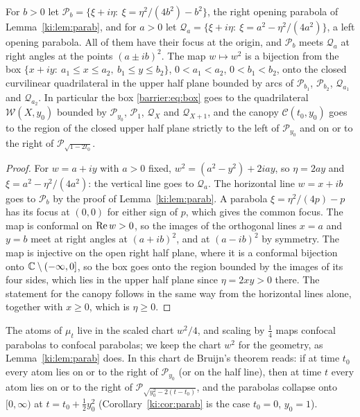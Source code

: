 \begin{lemma}\label{barrier:lem:quad}
For $b>0$ let $\mathcal P_b=\{\xi+i\eta:\ \xi=\eta^2/(4b^2)-b^2\}$, the right opening parabola of Lemma~\ref{ki:lem:parab}, and for $a>0$ let $\mathcal Q_a=\{\xi+i\eta:\ \xi=a^2-\eta^2/(4a^2)\}$, a left opening parabola. All of them have their focus at the origin, and $\mathcal P_b$ meets $\mathcal Q_a$ at right angles at the points $(a\pm ib)^2$. The map $w\mapsto w^2$ is a bijection from the box $\{x+iy:\ a_1\le x\le a_2,\ b_1\le y\le b_2\}$, $0<a_1<a_2$, $0<b_1<b_2$, onto the closed curvilinear quadrilateral in the upper half plane bounded by arcs of $\mathcal P_{b_1}$, $\mathcal P_{b_2}$, $\mathcal Q_{a_1}$ and $\mathcal Q_{a_2}$. In particular the box \eqref{barrier:eq:box} goes to the quadrilateral $\mathcal W(X,y_0)$ bounded by $\mathcal P_{y_0}$, $\mathcal P_1$, $\mathcal Q_X$ and $\mathcal Q_{X+1}$, and the canopy $\mathcal C(t_0,y_0)$ goes to the region of the closed upper half plane strictly to the left of $\mathcal P_{y_0}$ and on or to the right of $\mathcal P_{\sqrt{1-2t_0}}$.
\end{lemma}

\begin{proof}
For $w=a+iy$ with $a>0$ fixed, $w^2=(a^2-y^2)+2iay$, so $\eta=2ay$ and $\xi=a^2-\eta^2/(4a^2)$: the vertical line goes to $\mathcal Q_a$. The horizontal line $w=x+ib$ goes to $\mathcal P_b$ by the proof of Lemma~\ref{ki:lem:parab}. A parabola $\xi=\eta^2/(4p)-p$ has its focus at $(0,0)$ for either sign of $p$, which gives the common focus. The map is conformal on $\operatorname{Re} w>0$, so the images of the orthogonal lines $x=a$ and $y=b$ meet at right angles at $(a+ib)^2$, and at $(a-ib)^2$ by symmetry. The map is injective on the open right half plane, where it is a conformal bijection onto $\mathbb{C}\setminus(-\infty,0]$, so the box goes onto the region bounded by the images of its four sides, which lies in the upper half plane since $\eta=2xy>0$ there. The statement for the canopy follows in the same way from the horizontal lines alone, together with $x\ge0$, which is $\eta\ge0$.
\end{proof}

The atoms of $\mu_t$ live in the scaled chart $w^2/4$, and scaling by $\frac14$ maps confocal parabolas to confocal parabolas; we keep the chart $w^2$ for the geometry, as Lemma~\ref{ki:lem:parab} does. In this chart de Bruijn's theorem reads: if at time $t_0$ every atom lies on or to the right of $\mathcal P_{y_0}$ (or on the half line), then at time $t$ every atom lies on or to the right of $\mathcal P_{\sqrt{y_0^2-2(t-t_0)}}$, and the parabolas collapse onto $[0,\infty)$ at $t=t_0+\frac12y_0^2$ (Corollary~\ref{ki:cor:parab} is the case $t_0=0$, $y_0=1$).

